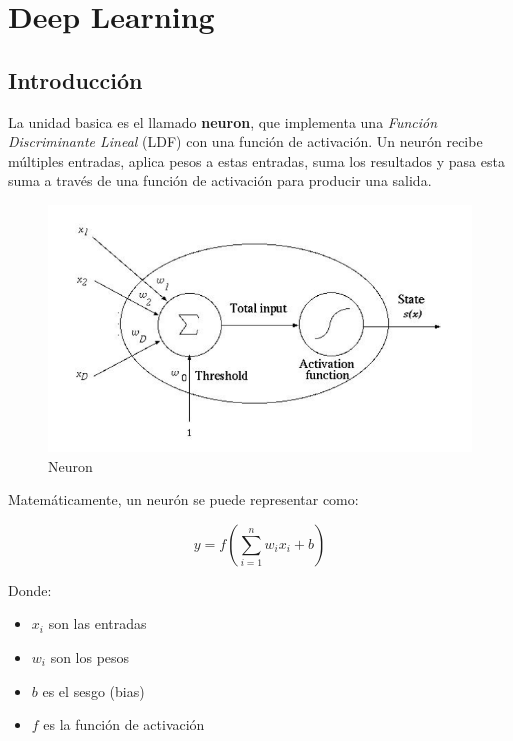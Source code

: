 \chapter{Deep Learning}

\section{Introducción}

\begin{paracol}{2}
   La unidad basica es el llamado \textbf{neuron}, que implementa una \textit{Función Discriminante Lineal} (\textsc{LDF}) con una función de activación. Un neurón recibe múltiples entradas, aplica pesos a estas entradas, suma los resultados y pasa esta suma a través de una función de activación para producir una salida.
   
   \switchcolumn

   \begin{figure}[htbp]
      \centering
      \includegraphics{images/08/neuron.png}
      \caption{Neuron}
      \label{fig:08/neuron}
   \end{figure}

\end{paracol}

Matemáticamente, un neurón se puede representar como:

\[ y = f\left(\sum_{i=1}^{n} w_i x_i + b\right) \]

Donde:
\begin{itemize}
   \item $x_i$ son las entradas
   \item $w_i$ son los pesos
   \item $b$ es el sesgo (bias)
   \item $f$ es la función de activación
\end{itemize}

